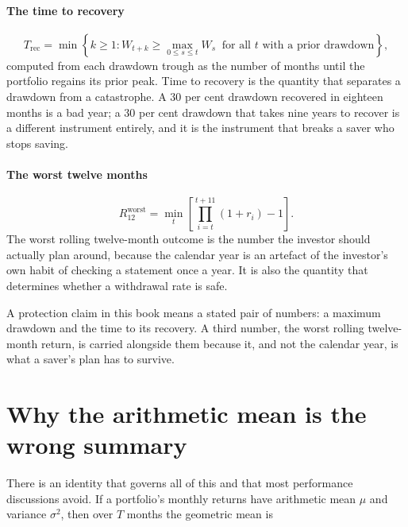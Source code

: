 \paragraph{The time to recovery}
\begin{equation}
T_{\mathrm{rec}} = \min\left\{ k \ge 1 :
W_{t+k} \ge \max_{0 \le s \le t} W_s \ \text{ for all } t \text{ with a
prior drawdown}\right\},
\end{equation}
computed from each drawdown trough as the number of months until the
portfolio regains its prior peak. Time to recovery is the quantity that
separates a drawdown from a catastrophe. A 30 per cent drawdown recovered in
eighteen months is a bad year; a 30 per cent drawdown that takes nine
years to recover is a different instrument entirely, and it is the
instrument that breaks a saver who stops saving.

\paragraph{The worst twelve months}
\begin{equation}
R_{12}^{\mathrm{worst}} = \min_{t}\left[
\prod_{i=t}^{t+11}(1+r_i) - 1 \right].
\end{equation}
The worst rolling twelve-month outcome is the number the investor should
actually plan around, because the calendar year is an artefact of the
investor's own habit of checking a statement once a year. It is also the
quantity that determines whether a withdrawal rate is safe.

\begin{takeaway}
A protection claim in this book means a stated pair of numbers: a maximum
drawdown and the time to its recovery. A third number, the worst rolling
twelve-month return, is carried alongside them because it, and not the
calendar year, is what a saver's plan has to survive.
\end{takeaway}

\section{Why the arithmetic mean is the wrong summary}

There is an identity that governs all of this and that most performance
discussions avoid. If a portfolio's monthly returns have arithmetic mean
\(\mu\) and variance \(\sigma^2\), then over \(T\) months the geometric
mean is

